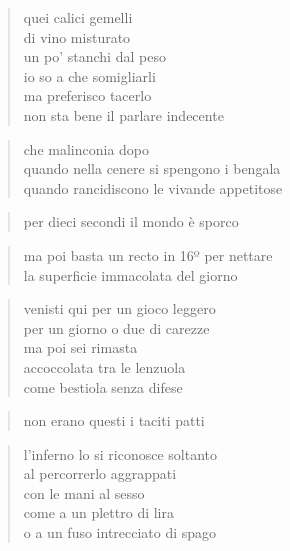 \begin{poem}
\begin{poem}

	\begin{verse}
		quei calici gemelli\\
		di vino misturato\\
		un po' stanchi dal peso\\
		io so a che somigliarli\\
		ma preferisco tacerlo\\
		non sta bene il parlare indecente
	\end{verse}

\clearpage


	\begin{verse}
		che malinconia dopo\\
		quando nella cenere si spengono i bengala\\
		quando rancidiscono le vivande appetitose
	\end{verse}

	\begin{verse}
		per dieci secondi il mondo è sporco
	\end{verse}

	\begin{verse}
		ma poi basta un recto in 16º per nettare\\
		la superficie immacolata del giorno
	\end{verse}

\clearpage


	\begin{verse}
		venisti qui per un gioco leggero\\
		per un giorno o due di carezze\\
		ma poi sei rimasta\\
		accoccolata tra le lenzuola\\
		come bestiola senza difese
	\end{verse}

	\begin{verse}
		non erano questi i taciti patti
	\end{verse}

\clearpage


	\begin{verse}
		l'inferno lo si riconosce soltanto\\
		al percorrerlo aggrappati\\
		con le mani al sesso\\
		come a un plettro di lira\\
		o a un fuso intrecciato di spago
	\end{verse}


\end{poem}
\end{poem}

